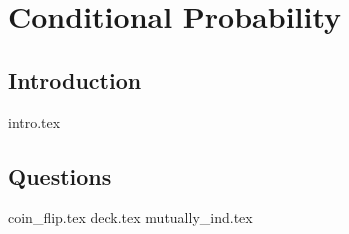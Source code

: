 \documentclass{exam}
\begin{document}

\section{Conditional Probability}
\subsection{Introduction}
{intro.tex}
\subsection{Questions}
\begin{questions}
{coin_flip.tex}
{deck.tex}
{mutually_ind.tex}
\end{questions}

\end{document}

